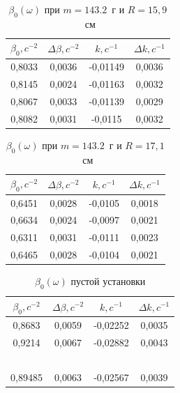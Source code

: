 \documentclass[a4paper,12pt]{article} %
\begin{document}
\begin{table}[!ht]
    \centering
    \begin{tabular}{|c|c|c|c|}
    \hline
        $\beta_0, c^{-2}$ & $\Delta \beta, c^{-2}$ & $k, c^{-1}$ & $\Delta k, c^{-1}$ \\ \hline
        0,8033 & 0,0036 & -0,01149 & 0,0036  \\ \hline
        0,8145 & 0,0024 & -0,01163 & 0,0032  \\ \hline
        0,8067 & 0,0033 & -0,01139 & 0,0029  \\ \hline
        0,8082 & 0,0031 & -0,0115 & 0,0032  \\ \hline
    \end{tabular}
    \caption{$\beta_0(\omega)$ при $m=143.2$~г и $R= 15,9$~см}
\end{table}
\begin{table}[!ht]
    \centering
    \begin{tabular}{|c|c|c|c|}
    \hline
        $\beta_0, c^{-2}$ & $\Delta \beta, c^{-2}$ & $k, c^{-1}$ & $\Delta k, c^{-1}$ \\ \hline
        0,6451 & 0,0028 & -0,0105 & 0,0018  \\ \hline
        0,6634 & 0,0024 & -0,0097 & 0,0021  \\ \hline
        0,6311 & 0,0031 & -0,0111 & 0,0023  \\ \hline
        0,6465 & 0,0028 & -0,0104 & 0,0021  \\ \hline
    \end{tabular}
    \caption{$\beta_0(\omega)$ при $m=143.2$~г и $R= 17,1$~см}
\end{table}
\begin{table}[!ht]
    \centering
    \begin{tabular}{|c|c|c|c|}
    \hline
        $\beta_0, c^{-2}$ & $\Delta \beta, c^{-2}$ & $k, c^{-1}$ & $\Delta k, c^{-1}$ \\ \hline
        0,8683 & 0,0059 & -0,02252 & 0,0035  \\ \hline
        0,9214 & 0,0067 & -0,02882 & 0,0043  \\ \hline
        ~ & ~ & ~ &   \\ \hline
        0,89485 & 0,0063 & -0,02567 & 0,0039  \\ \hline
    \end{tabular}
    \caption{$\beta_0(\omega)$ пустой установки}
\end{table}
\end{document}
